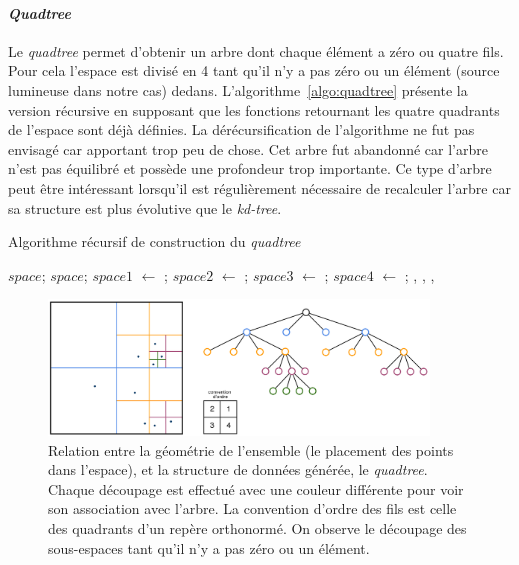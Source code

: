 			\paragraph{\emph{Quadtree}}
Le \emph{quadtree} permet d'obtenir un arbre dont chaque élément a zéro ou quatre fils. Pour cela l'espace est divisé en 4 tant qu'il n'y a pas zéro ou un élément (source lumineuse dans notre cas) dedans. L'algorithme~\ref{algo:quadtree} présente la version récursive en supposant que les fonctions retournant les quatre quadrants de l'espace sont déjà définies. La dérécursification de l'algorithme ne fut pas envisagé car apportant trop peu de chose. Cet arbre fut abandonné car l'arbre n'est pas équilibré et possède une profondeur trop importante. Ce type d'arbre peut être intéressant lorsqu'il est régulièrement nécessaire de recalculer l'arbre car sa structure est plus évolutive que le \emph{kd-tree}.

	\begin{algorithm}
		\caption{Algorithme récursif de construction du \emph{quadtree}}
		\label{algo:quadtree}
		\begin{algorithmic}[1]
					\State \Return $space$;
					\State \Return $space$;
				\Else
					\State $space1$ $\gets$ ;
					\State $space2$ $\gets$ ;
					\State $space3$ $\gets$ ;
					\State $space4$ $\gets$ ;
					\State \Return {}, , , 
				\EndIf
			\EndFunction
		\end{algorithmic}
	\end{algorithm}

	\begin{figure}[h]
		\centering
		\includegraphics[width=0.9\textwidth]{img/quadtree.png}
		\caption[Relation entre la géométrie de l'ensemble et le \emph{quadtree} généré]{Relation entre la géométrie de l'ensemble (le placement des points dans l'espace), et la structure de données générée, le \emph{quadtree}. Chaque découpage est effectué avec une couleur différente pour voir son association avec l'arbre. La convention d'ordre des fils est celle des quadrants d'un repère orthonormé. On observe le découpage des sous-espaces tant qu'il n'y a pas zéro ou un élément.}
		\label{fig:quadtree}
	\end{figure}

